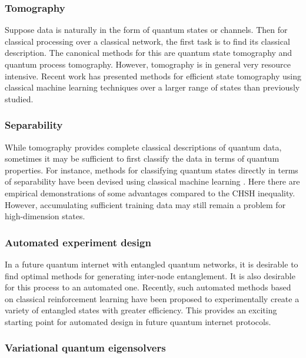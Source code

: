 \documentclass[twocolumn, aps, rmp, amsmath, amssymb, nofootinbib, superscriptaddress, longbibliography, floatfix, table-of-contents, eqsecnum]{revtex4}
\begin{document}
\subsubsection{Tomography}

Suppose data is naturally in the form of quantum states or channels. Then for classical processing over a classical network, the first task is to find its classical description. The canonical methods for this are quantum state tomography and quantum process tomography. However, tomography is in general very resource intensive. Recent work has presented methods for efficient state tomography using classical machine learning techniques \cite{bib:Torlai2017, bib:Han2017} over a larger range of states than previously studied.

\subsubsection{Separability}

While tomography provides complete classical descriptions of quantum data, sometimes it may be sufficient to first classify the data in terms of quantum properties. For instance, methods for classifying quantum states directly in terms of separability have been devised using classical machine learning \cite{bib:Ma2017, bib:Su2017, bib:Gao2018}. Here there are empirical demonstrations of some advantages compared to the CHSH inequality. However, accumulating sufficient training data may still remain a problem for high-dimension states.

\subsubsection{Automated experiment design}

In a future quantum internet with entangled quantum networks, it is desirable to find optimal methods for generating inter-node entanglement. It is also desirable for this process to an automated one. Recently, such automated methods based on classical reinforcement learning \cite{bib:alexey} have been proposed to experimentally create a variety of entangled states with greater efficiency. This provides an exciting starting point for automated design in future quantum internet protocols. 

\subsubsection{Variational quantum eigensolvers}
\end{document}

